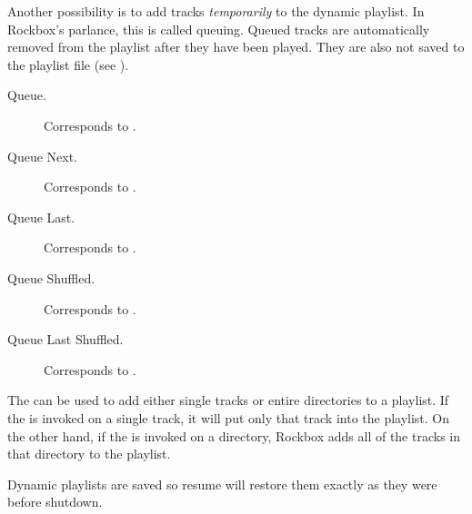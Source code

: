 Another possibility is to add tracks \emph{temporarily} to the dynamic playlist.
In Rockbox’s parlance, this is called queuing. Queued tracks are automatically
removed from the playlist after they have been played. They are also not saved
to the playlist file (see ).

\begin{description}
\item [Queue.] Corresponds to .

\item [Queue Next.] Corresponds to .

\item [Queue Last.] Corresponds to .

\item [Queue Shuffled.] Corresponds to .

\item [Queue Last Shuffled.] Corresponds to .
\end{description}


The   can be used to add either single tracks or
entire directories to a playlist. If the  is
invoked on a single track, it will put only that track into the playlist.
On the other hand, if the  is invoked on a
directory, Rockbox adds all of the tracks in that directory to the
playlist.


Dynamic playlists are saved so resume will restore them exactly as they
were before shutdown.

